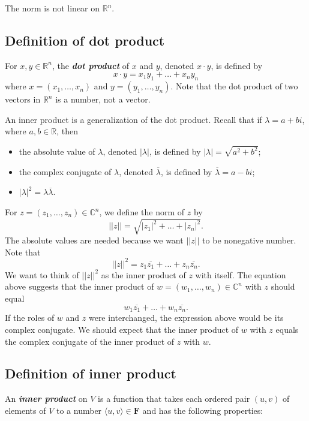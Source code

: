 \documentclass[11pt]{article}
\begin{document}
    The norm is not linear on \(\mathbb{R}^n\).

    \subsection{Definition of dot product}

    For \(x,y \in \mathbb{R}^n\), the \textbf{\emph{dot product}} of $x$ and $y$, denoted \(x \cdot y\), is defined by \[x \cdot y = x_1 y_1 + \dots + x_n y_n\] where \(x = (x_1, \dots, x_n)\) and \(y = (y_1, \dots, y_n)\). Note that the dot product of two vectors in \(\mathbb{R}^n\) is a number, not a vector. 

    \vspace{1em}

    An inner product is a generalization of the dot product. Recall that if \(\lambda = a + bi\), where \(a,b \in \mathbb{R}\), then 
    \begin{itemize}
        \item the absolute value of \(\lambda\), denoted \(|\lambda|\), is defined by \(|\lambda| = \sqrt{a^2 + b^2}\);
        \item the complex conjugate of \(\lambda\), denoted \(\overline{\lambda}\), is defined by \(\overline{\lambda} = a - bi\);
        \item \(|\lambda|^2 = \lambda \overline{\lambda}\).
    \end{itemize}
    For \(z = (z_1, \dots, z_n) \in \mathbb{C}^n\), we define the norm of $z$ by \[||z|| = \sqrt{|z_1|^2 + \dots + |z_n|^2}.\] The absolute values are needed because we want \(||z||\) to be nonegative number. Note that \[||z||^2 = z_1 \overline{z_1} + \dots + z_n \overline{z_n}.\] We want to think of \(||z||^2\) as the inner product of $z$ with itself. The equation above suggests that the inner product of \(w = (w_1, \dots, w_n) \in \mathbb{C}^n\) with $z$ should equal \[w_1 \overline{z_1} + \dots + w_n \overline{z_n}.\] If the roles of $w$ and $z$ were interchanged, the expression above would be its complex conjugate. We should expect that the inner product of $w$ with $z$ equals the complex conjugate of the inner product of $z$ with $w$. 

    \subsection{Definition of inner product}

    An \textbf{\emph{inner product}} on $V$ is a function that takes each ordered pair \((u,v)\) of elements of $V$ to a number \(\langle u,v \rangle \in \textbf{F}\) and has the following properties:
\end{document}
